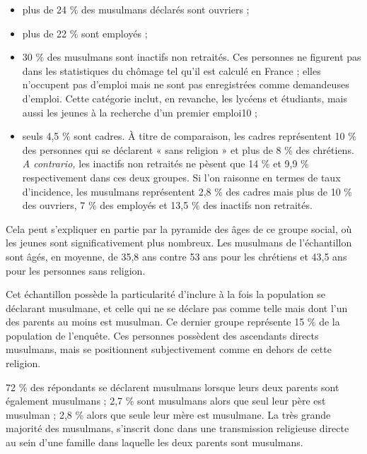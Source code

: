 \begin{itemize}
\item
  
  plus de 24 \% des musulmans déclarés sont ouvriers ;
  
\item
  
  plus de 22 \% sont employés ;
  
\item
  
  30 \% des musulmans sont inactifs non retraités. Ces personnes ne
  figurent pas dans les statistiques du chômage tel qu'il est calculé en
  France ; elles n'occupent pas d'emploi mais ne sont pas enregistrées
  comme demandeuses d'emploi. Cette catégorie inclut, en revanche, les
  lycéens et étudiants, mais aussi les jeunes à la recherche d'un
  premier emploi10 ;
  
\item
  
  seuls 4,5 \% sont cadres. À titre de comparaison, les cadres
  représentent 10 \% des personnes qui se déclarent « sans religion » et
  plus de 8 \% des chrétiens. \emph{A contrario,} les inactifs non
  retraités ne pèsent que 14 \% et 9,9 \% respectivement dans ces deux
  groupes. Si l'on raisonne en termes de taux d'incidence, les musulmans
  représentent 2,8 \% des cadres mais plus de 10 \% des ouvriers, 7 \%
  des employés et 13,5 \% des inactifs non retraités.
  
\end{itemize}


Cela peut s'expliquer en partie par la pyramide des âges de ce groupe
social, où les jeunes sont significativement plus nombreux. Les
musulmans de l'échantillon sont âgés, en moyenne, de 35,8 ans contre 53
ans pour les chrétiens et 43,5 ans pour les personnes sans religion.

Cet échantillon possède la particularité d'inclure à la fois la
population se déclarant musulmane, et celle qui ne se déclare pas comme
telle mais dont l'un des parents au moins est musulman. Ce dernier
groupe représente 15 \% de la population de l'enquête. Ces personnes
possèdent des ascendants directs musulmans, mais se positionnent
subjectivement comme en dehors de cette religion.






72 \% des répondants se déclarent musulmans lorsque leurs deux parents
sont également musulmans ; 2,7 \% sont musulmans alors que seul leur
père est musulman ; 2,8 \% alors que seule leur mère est musulmane. La
très grande majorité des musulmans, s'inscrit donc dans une transmission
religieuse directe au sein d'une famille dans laquelle les deux parents
sont musulmans.

